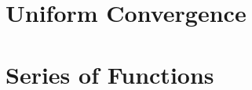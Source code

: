\documentclass[british,11pt,a4paper]{report}
\begin{document}
\maketitle
\tableofcontents

\chapter{Uniform Convergence}

\chapter{Series of Functions}

\end{document}
